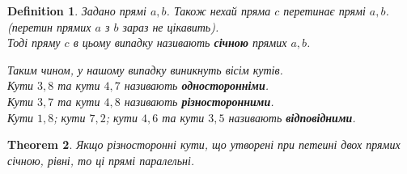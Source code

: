 \documentclass[a4paper, 10pt]{article}
\theoremstyle{theoremdd}
\newtheorem{theorem}{Theorem}[subsection]
\theoremstyle{theoremdd}
\theoremstyle{theoremdd}
\newtheorem{definition}[theorem]{Definition}
\theoremstyle{theoremdd}
\theoremstyle{theoremdd}
\theoremstyle{theoremdd}
\theoremstyle{theoremdd}
\theoremstyle{theoremdd}
\theoremstyle{theoremdd}
\begin{document}
\begin{definition}
Задано прямі $a,b$. Також нехай пряма $c$ перетинає прямі $a,b$. (перетин прямих $a$ з $b$ зараз не цікавить).\\
Тоді пряму $c$ в цьому випадку називають \textbf{січною} прямих $a,b$.
\begin{figure}[H]
\centering
{}
\end{figure}
Таким чином, у нашому випадку виникнуть вісім кутів.\\
Кути $3,8$ та кути $4,7$ називають \textbf{односторонніми}.\\
Кути $3,7$ та кути $4,8$ називають \textbf{різносторонними}.\\
Кути $1,8$; кути $7,2$; кути $4,6$ та кути $3,5$ називають \textbf{відповідними}.
\end{definition}

\begin{theorem}
Якщо різносторонні кути, що утворені при петеині двох прямих січною, рівні, то ці прямі паралельні.
\end{theorem}
\end{document}
